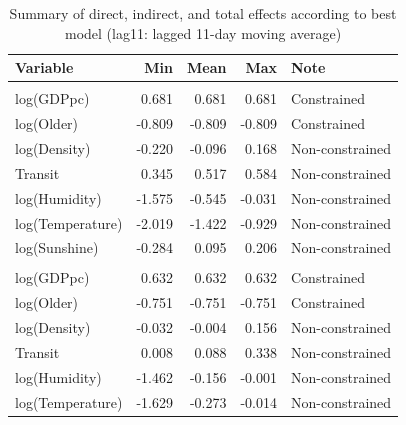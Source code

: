 \documentclass[]{elsarticle} %
\begin{document}
\begin{table}

\caption{\label{tab:summary-impacts-best-model}\label{tab:summary-impacts-best-model}Summary of direct, indirect, and total effects according to best model (lag11: lagged 11-day moving average)}
\centering
\begin{tabular}[t]{lrrrl}
\toprule
Variable & Min & Mean & Max & Note\\
\midrule
\rowcolor{gray!6}  \addlinespace[0.3em]
\multicolumn{5}{l}{\textbf{Direct Effects}}\\
\hspace{1em}log(GDPpc) & 0.681 & 0.681 & 0.681 & Constrained\\
\hspace{1em}log(Older) & -0.809 & -0.809 & -0.809 & Constrained\\
\rowcolor{gray!6}  \hspace{1em}log(Density) & -0.220 & -0.096 & 0.168 & Non-constrained\\
\hspace{1em}Transit & 0.345 & 0.517 & 0.584 & Non-constrained\\
\rowcolor{gray!6}  \hspace{1em}log(Humidity) & -1.575 & -0.545 & -0.031 & Non-constrained\\
\hspace{1em}log(Temperature) & -2.019 & -1.422 & -0.929 & Non-constrained\\
\rowcolor{gray!6}  \hspace{1em}log(Sunshine) & -0.284 & 0.095 & 0.206 & Non-constrained\\
\addlinespace[0.3em]
\multicolumn{5}{l}{\textbf{Indirect Effects}}\\
\hspace{1em}log(GDPpc) & 0.632 & 0.632 & 0.632 & Constrained\\
\rowcolor{gray!6}  \hspace{1em}log(Older) & -0.751 & -0.751 & -0.751 & Constrained\\
\hspace{1em}log(Density) & -0.032 & -0.004 & 0.156 & Non-constrained\\
\rowcolor{gray!6}  \hspace{1em}Transit & 0.008 & 0.088 & 0.338 & Non-constrained\\
\hspace{1em}log(Humidity) & -1.462 & -0.156 & -0.001 & Non-constrained\\
\rowcolor{gray!6}  \hspace{1em}log(Temperature) & -1.629 & -0.273 & -0.014 & Non-constrained\\

\end{tabular}
\end{table}
\end{document}

